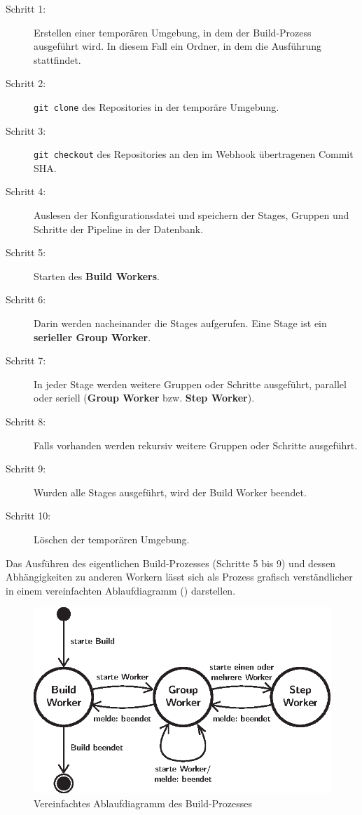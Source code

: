 \begin{description}
  \item[Schritt 1:] Erstellen einer temporären Umgebung, in dem der Build-Prozess ausgeführt wird. In diesem Fall ein Ordner, in dem die Ausführung stattfindet.
  \item[Schritt 2:] \texttt{git clone} des Repositories in der temporäre Umgebung.
  \item[Schritt 3:] \texttt{git checkout} des Repositories an den im Webhook übertragenen Commit SHA.
  \item[Schritt 4:] Auslesen der Konfigurationsdatei und speichern der Stages, Gruppen und Schritte der Pipeline in der Datenbank.
  \item[Schritt 5:] Starten des \textbf{Build Workers}.
  \item[Schritt 6:] Darin werden nacheinander die Stages aufgerufen. Eine Stage ist ein \textbf{serieller Group Worker}.
  \item[Schritt 7:] In jeder Stage werden weitere Gruppen oder Schritte ausgeführt, parallel oder seriell (\textbf{Group Worker} bzw. \textbf{Step Worker}).
  \item[Schritt 8:] Falls vorhanden werden rekursiv weitere Gruppen oder Schritte ausgeführt.
  \item[Schritt 9:] Wurden alle Stages ausgeführt, wird der Build Worker beendet.
  \item[Schritt 10:] Löschen der temporären Umgebung.
\end{description}

Das Ausführen des eigentlichen Build-Prozesses (Schritte 5 bis 9) und dessen Abhängigkeiten zu anderen Workern lässt sich als Prozess grafisch verständlicher in einem vereinfachten Ablaufdiagramm () darstellen.

\begin{figure}[h]
  \caption{Vereinfachtes Ablaufdiagramm des Build-Prozesses}
  \label{fig:ablauf-build-prozess}
  \centering
    \includegraphics[width=.7\textwidth]{assets/worker_diagram}
\end{figure}

